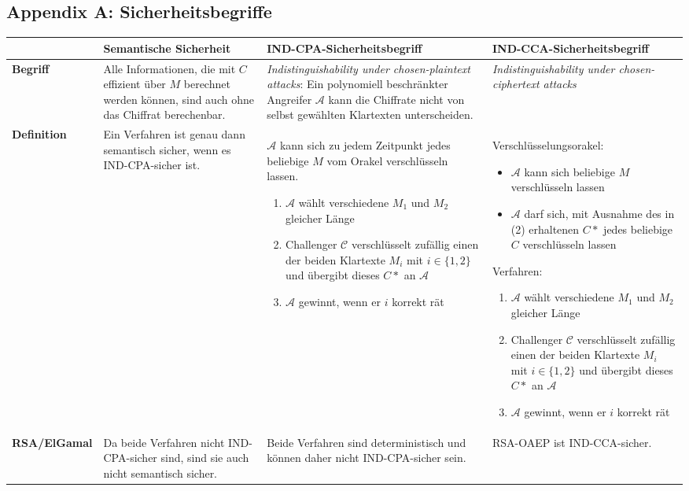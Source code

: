 \begin{landscape}
\setlength\extrarowheight{5pt}

\section{Appendix A: Sicherheitsbegriffe}
\begin{table}[H]
\begin{tabularx}{\linewidth}{|l|X|X|X|}
\hline
& \textbf{Semantische Sicherheit} & \textbf{IND-CPA-Sicherheitsbegriff} & \textbf{IND-CCA-Sicherheitsbegriff} 	\\
\hline
\textbf{Begriff} &
Alle Informationen, die mit \(C\) effizient über \(M\) berechnet werden können, sind auch ohne das Chiffrat berechenbar. &
\textit{Indistinguishability under chosen-plaintext attacks}: Ein polynomiell beschränkter Angreifer \(\mathcal{A}\) kann die Chiffrate nicht von selbst gewählten Klartexten unterscheiden. &
\textit{Indistinguishability under chosen-ciphertext attacks}\\
\hline
\textbf{Definition} &
Ein Verfahren ist genau dann semantisch sicher, wenn es IND-CPA-sicher ist.&
\(\mathcal{A}\) kann sich zu jedem Zeitpunkt jedes beliebige \(M\) vom Orakel verschlüsseln lassen.
\begin{enumerate}
	\item \(\mathcal{A}\) wählt verschiedene \(M_1\) und \(M_2\) gleicher Länge
	\item Challenger \(\mathcal{C}\) verschlüsselt zufällig einen der beiden Klartexte \(M_i\) mit \(i \in \{1,2\}\) und übergibt dieses \(C*\) an \(\mathcal{A}\)
	\item \(\mathcal{A}\) gewinnt, wenn er \(i\) korrekt rät
\end{enumerate}&
Verschlüsselungsorakel:
\begin{itemize}
	\item \(\mathcal{A}\) kann sich beliebige \(M\) verschlüsseln lassen
	\item \(\mathcal{A}\) darf sich, mit Ausnahme des in (2) erhaltenen \(C*\) jedes beliebige \(C\) verschlüsseln lassen
\end{itemize}
Verfahren:
\begin{enumerate}
	\item \(\mathcal{A}\) wählt verschiedene \(M_1\) und \(M_2\) gleicher Länge
	\item Challenger \(\mathcal{C}\) verschlüsselt zufällig einen der beiden Klartexte \(M_i\) mit \(i \in \{1,2\}\) und übergibt dieses \(C*\) an \(\mathcal{A}\)
	\item \(\mathcal{A}\) gewinnt, wenn er \(i\) korrekt rät
\end{enumerate}\\
\hline
\textbf{RSA/ElGamal}&
Da beide Verfahren nicht IND-CPA-sicher sind, sind sie auch nicht semantisch sicher.&
Beide Verfahren sind deterministisch und können daher nicht IND-CPA-sicher sein.&
RSA-OAEP ist IND-CCA-sicher.\\
\hline
\end{tabularx}
\end{table}



\end{landscape}
